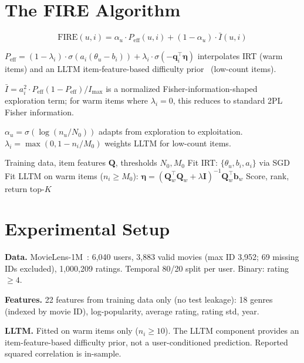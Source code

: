 \documentclass[11pt,a4paper]{article}
\begin{document}
\section{The FIRE Algorithm}

\begin{equation}
\text{FIRE}(u, i) = \alpha_u \cdot P_{\text{eff}}(u,i) + (1 - \alpha_u) \cdot \bar{I}(u,i)
\end{equation}

$P_{\text{eff}} = (1 - \lambda_i) \cdot \sigma(a_i(\theta_u - b_i)) + \lambda_i \cdot \sigma(-\mathbf{q}_i^\top \boldsymbol{\eta})$ interpolates IRT (warm items) and an LLTM item-feature-based difficulty prior~\citep{fischer1973} (low-count items).

$\bar{I} = a_i^2 \cdot P_{\text{eff}}(1 - P_{\text{eff}}) / I_{\max}$ is a normalized Fisher-information-shaped exploration term; for warm items where $\lambda_i = 0$, this reduces to standard 2PL Fisher information.

$\alpha_u = \sigma(\log(n_u / N_0))$ adapts from exploration to exploitation. $\lambda_i = \max(0, 1 - n_i / M_0)$ weights LLTM for low-count items.

\begin{algorithm}[H]
\caption{FIRE Recommendation}
\begin{algorithmic}[1]
\REQUIRE Training data, item features $\mathbf{Q}$, thresholds $N_0, M_0$
\STATE Fit IRT: $\{\theta_u, b_i, a_i\}$ via SGD
\STATE Fit LLTM on warm items ($n_i \geq M_0$): $\boldsymbol{\eta} = (\mathbf{Q}_w^\top\mathbf{Q}_w + \lambda\mathbf{I})^{-1}\mathbf{Q}_w^\top\mathbf{b}_w$
    \STATE Score, rank, return top-$K$
\ENDFOR
\end{algorithmic}
\end{algorithm}

\section{Experimental Setup}

\textbf{Data.} MovieLens-1M~\citep{harper2015movielens}: 6,040 users, 3,883 valid movies (max ID 3,952; 69 missing IDs excluded), 1,000,209 ratings. Temporal 80/20 split per user. Binary: rating $\geq 4$.

\textbf{Features.} 22 features from training data only (no test leakage): 18 genres (indexed by movie ID), log-popularity, average rating, rating std, year.

\textbf{LLTM.} Fitted on warm items only ($n_i \geq 10$). The LLTM component provides an item-feature-based difficulty prior, not a user-conditioned prediction. Reported squared correlation is in-sample.
\end{document}
